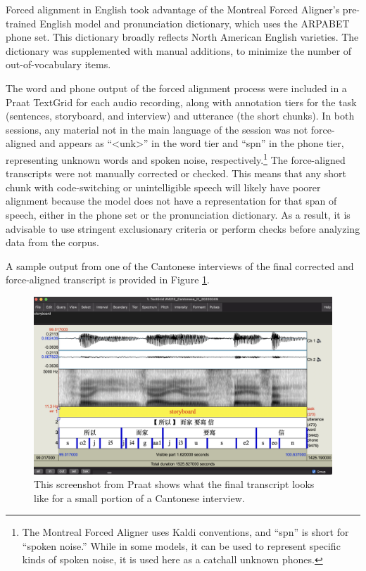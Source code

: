 Forced alignment in English took advantage of the Montreal Forced Aligner's pre-trained English model and pronunciation dictionary, which uses the ARPABET phone set. This dictionary broadly reflects North American English varieties. The dictionary was supplemented with manual additions, to minimize the number of out-of-vocabulary items.

The word and phone output of the forced alignment process were included in a Praat TextGrid for each audio recording, along with annotation tiers for the task (sentences, storyboard, and interview) and utterance (the short chunks). In both sessions, any material not in the main language of the session was not force-aligned and appears as ``<unk>'' in the word tier and ``spn'' in the phone tier, representing unknown words and spoken noise, respectively.\footnote{The Montreal Forced Aligner uses Kaldi conventions, and ``spn'' is short for ``spoken noise.'' While in some models, it can be used to represent specific kinds of spoken noise, it is used here as a catchall unknown phones.} The force-aligned transcripts were not manually corrected or checked. This means that any short chunk with code-switching or unintelligible speech will likely have poorer alignment because the model does not have a representation for that span of speech, either in the phone set or the pronunciation dictionary. As a result, it is advisable to use stringent exclusionary criteria or perform checks before analyzing data from the corpus. 

A sample output from one of the Cantonese interviews of the final corrected and force-aligned transcript is provided in Figure \ref{ch2:fig:praat}.

\begin{figure}[htbp]
  \begin{center}
  \includegraphics[width=\textwidth]{figures/ch2_praat_transcript.png} 
  \caption{This screenshot from Praat shows what the final transcript looks like for a small portion of a Cantonese interview.}
  \label{ch2:fig:praat}
  \end{center}
\end{figure}



